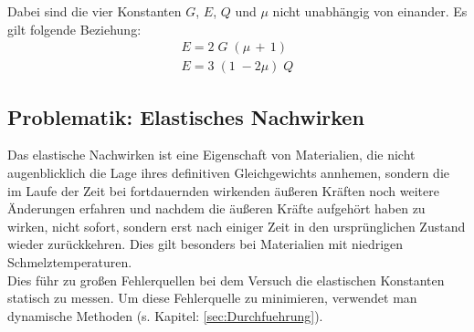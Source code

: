 Dabei sind die vier Konstanten $G$, $E$, $Q$ und $\mu$ nicht unabhängig von einander.
Es gilt folgende Beziehung:
\begin{gather}
    E = 2\;G\;(\mu\,+\,1) \\
    E = 3\;(1\;-2\mu)\;Q
    \label{eqn:Beziehung}
\end{gather}


\subsection{Problematik: Elastisches Nachwirken}
Das elastische Nachwirken ist eine Eigenschaft von Materialien, die nicht augenblicklich die Lage ihres definitiven 
Gleichgewichts annhemen, sondern die im Laufe der Zeit bei fortdauernden wirkenden äußeren Kräften noch weitere Änderungen
erfahren und nachdem die äußeren Kräfte aufgehört haben zu wirken, nicht sofort, sondern erst nach einiger Zeit in den 
ursprünglichen Zustand wieder zurückkehren.\cite{elastisches_Nachwirken}
Dies gilt besonders bei Materialien mit niedrigen Schmelztemperaturen.\\
Dies führ zu großen Fehlerquellen bei dem Versuch die elastischen Konstanten statisch 
zu messen.\newline
Um diese Fehlerquelle zu minimieren, verwendet man dynamische Methoden (s. Kapitel: \ref{sec:Durchfuehrung}).
\label{sec:nachwirken_vorb}


\label{sec:Theorie}
